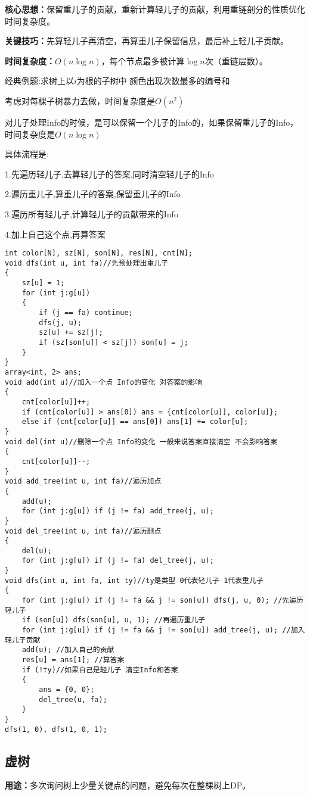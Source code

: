 \documentclass[a4paper, fontset=none]{ctexart}
\begin{document}
\textbf{核心思想：}保留重儿子的贡献，重新计算轻儿子的贡献，利用重链剖分的性质优化时间复杂度。

\textbf{关键技巧：}先算轻儿子再清空，再算重儿子保留信息，最后补上轻儿子贡献。

\textbf{时间复杂度：}$O(n\log n)$，每个节点最多被计算$\log n$次（重链层数）。

经典例题:求树上以$i$为根的子树中 颜色出现次数最多的编号和

考虑对每棵子树暴力去做，时间复杂度是$O(n ^ 2)$

对儿子处理Info的时候，是可以保留一个儿子的Info的，如果保留重儿子的Info，时间复杂度是$O(n\log n)$

具体流程是:

1.先遍历轻儿子,去算轻儿子的答案,同时清空轻儿子的Info

2.遍历重儿子,算重儿子的答案,保留重儿子的Info

3.遍历所有轻儿子,计算轻儿子的贡献带来的Info

4.加上自己这个点,再算答案

\begin{verbatim}
int color[N], sz[N], son[N], res[N], cnt[N];
void dfs(int u, int fa)//先预处理出重儿子
{
    sz[u] = 1;
    for (int j:g[u])
    {
        if (j == fa) continue;
        dfs(j, u);
        sz[u] += sz[j];
        if (sz[son[u]] < sz[j]) son[u] = j;
    }
}
array<int, 2> ans;
void add(int u)//加入一个点 Info的变化 对答案的影响
{
    cnt[color[u]]++;
    if (cnt[color[u]] > ans[0]) ans = {cnt[color[u]], color[u]};
    else if (cnt[color[u]] == ans[0]) ans[1] += color[u];
}
void del(int u)//删除一个点 Info的变化 一般来说答案直接清空 不会影响答案
{
    cnt[color[u]]--;
}
void add_tree(int u, int fa)//遍历加点
{
    add(u);
    for (int j:g[u]) if (j != fa) add_tree(j, u);
}
void del_tree(int u, int fa)//遍历删点
{
    del(u);
    for (int j:g[u]) if (j != fa) del_tree(j, u);
}
void dfs(int u, int fa, int ty)//ty是类型 0代表轻儿子 1代表重儿子
{
    for (int j:g[u]) if (j != fa && j != son[u]) dfs(j, u, 0); //先遍历轻儿子
    if (son[u]) dfs(son[u], u, 1); //再遍历重儿子
    for (int j:g[u]) if (j != fa && j != son[u]) add_tree(j, u); //加入轻儿子贡献
    add(u); //加入自己的贡献
    res[u] = ans[1]; //算答案
    if (!ty)//如果自己是轻儿子 清空Info和答案
    {
        ans = {0, 0};
        del_tree(u, fa);
    }
}
dfs(1, 0), dfs(1, 0, 1);
\end{verbatim}
\subsection{虚树}
\textbf{用途：}多次询问树上少量关键点的问题，避免每次在整棵树上DP。
\end{document}
